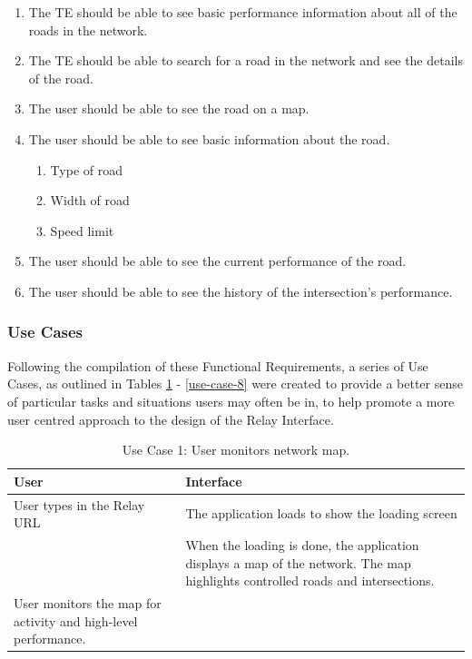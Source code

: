 \documentclass{report}
\begin{document}
\begin{enumerate}
\begin{enumerate}
    \item The TE should be able to see basic performance information about all of the roads in the network.
    \item The TE should be able to search for a road in the network and see the details of the road.
    \item The user should be able to see the road on a map.
    \item The user should be able to see basic information about the road.
    \begin{enumerate}
    	\item Type of road
	\item Width of road
	\item Speed limit
    \end{enumerate}
    \item The user should be able to see the current performance of the road.
    \item The user should be able to see the history of the intersection's performance.
  \end{enumerate}
\end{enumerate}


\subsubsection{Use Cases}
Following the compilation of these Functional Requirements, a series of Use Cases, as outlined in Tables \ref{use-case-1} - \ref{use-case-8} were created to provide a better sense of particular tasks and situations users may often be in, to help promote a more user centred approach to the design of the Relay Interface.

\begin{table}[htbp]
\begin{centering}
    \begin{tabular}{| p{7cm} | p{7cm} |}
    \hline
    User    & Interface   \\ \hline
    User types in the Relay URL    &     The application loads to show the loading screen    \\ \hline
    ~      & When the loading is done, the application displays a map of the network. The map highlights controlled roads and intersections. \\ \hline
     User monitors the map for activity and high-level performance. & ~          \\ \hline
    \end{tabular}
    \caption {Use Case 1: User monitors network map.}
    \label{use-case-1}
   \end{centering}
\end{table}
\end{document}
